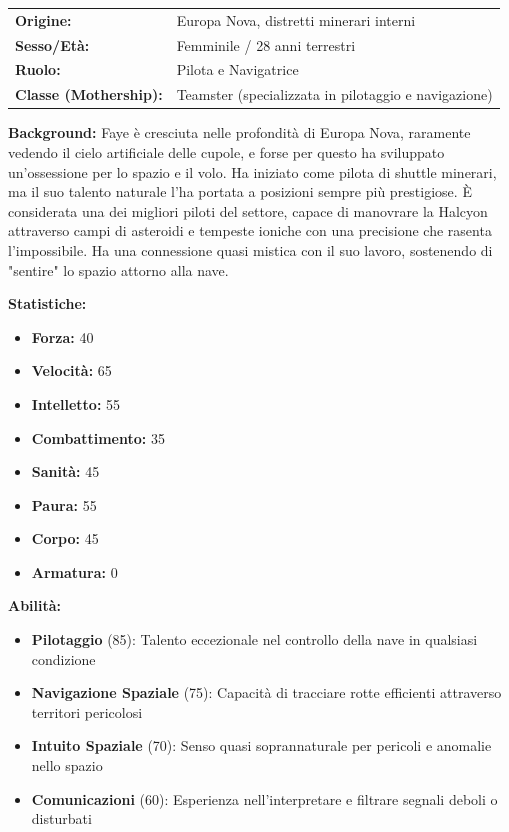 \documentclass[11pt,a4paper]{article}
\begin{document}
\begin{tcolorbox}[colback=mininglightorange!20, colframe=miningorange]
\begin{tabularx}{\textwidth}{lX}
\textbf{Origine:} & Europa Nova, distretti minerari interni \\
\textbf{Sesso/Età:} & Femminile / 28 anni terrestri \\
\textbf{Ruolo:} & Pilota e Navigatrice \\
\textbf{Classe (Mothership):} & Teamster (specializzata in pilotaggio e navigazione) \\
\end{tabularx}

\textbf{Background:} Faye è cresciuta nelle profondità di Europa Nova, raramente vedendo il cielo artificiale delle cupole, e forse per questo ha sviluppato un'ossessione per lo spazio e il volo. Ha iniziato come pilota di shuttle minerari, ma il suo talento naturale l'ha portata a posizioni sempre più prestigiose. È considerata una dei migliori piloti del settore, capace di manovrare la Halcyon attraverso campi di asteroidi e tempeste ioniche con una precisione che rasenta l'impossibile. Ha una connessione quasi mistica con il suo lavoro, sostenendo di "sentire" lo spazio attorno alla nave.

\textbf{Statistiche:}
\begin{itemize}[leftmargin=*]
\item \textbf{Forza:} 40
\item \textbf{Velocità:} 65
\item \textbf{Intelletto:} 55
\item \textbf{Combattimento:} 35
\item \textbf{Sanità:} 45
\item \textbf{Paura:} 55
\item \textbf{Corpo:} 45
\item \textbf{Armatura:} 0
\end{itemize}

\textbf{Abilità:}
\begin{itemize}[leftmargin=*]
\item \textbf{Pilotaggio} (85): Talento eccezionale nel controllo della nave in qualsiasi condizione
\item \textbf{Navigazione Spaziale} (75): Capacità di tracciare rotte efficienti attraverso territori pericolosi
\item \textbf{Intuito Spaziale} (70): Senso quasi soprannaturale per pericoli e anomalie nello spazio
\item \textbf{Comunicazioni} (60): Esperienza nell'interpretare e filtrare segnali deboli o disturbati
\end{itemize}


\end{tcolorbox}
\end{document}

